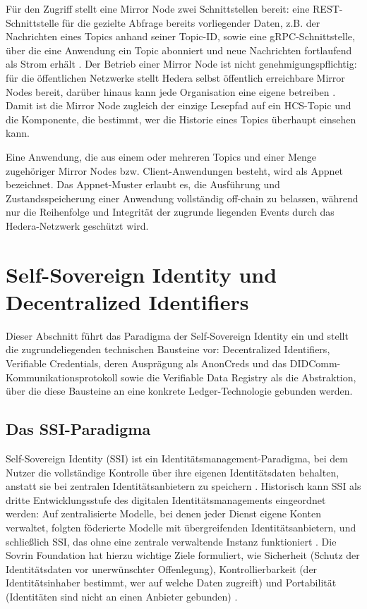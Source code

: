 Für den Zugriff stellt eine Mirror Node zwei Schnittstellen bereit: eine REST-Schnittstelle für die gezielte Abfrage bereits vorliegender Daten, z.B. der Nachrichten eines Topics anhand seiner Topic-ID, sowie eine gRPC-Schnittstelle, über die eine Anwendung ein Topic abonniert und neue Nachrichten fortlaufend als Strom erhält \cite{hederamirrornodes}. Der Betrieb einer Mirror Node ist nicht genehmigungspflichtig: für die öffentlichen Netzwerke stellt Hedera selbst öffentlich erreichbare Mirror Nodes bereit, darüber hinaus kann jede Organisation eine eigene betreiben \cite{hederamirrornodes, hederamainnetnodes}. Damit ist die Mirror Node zugleich der einzige Lesepfad auf ein HCS-Topic und die Komponente, die bestimmt, wer die Historie eines Topics überhaupt einsehen kann.

Eine Anwendung, die aus einem oder mehreren Topics und einer Menge zugehöriger Mirror Nodes bzw. Client-Anwendungen besteht, wird als Appnet bezeichnet. Das Appnet-Muster erlaubt es, die Ausführung und Zustandsspeicherung einer Anwendung vollständig off-chain zu belassen, während nur die Reihenfolge und Integrität der zugrunde liegenden Events durch das Hedera-Netzwerk geschützt wird. \cite{bairdgross2019}


\section{Self-Sovereign Identity und Decentralized Identifiers}
\label{sec:grundlagen-ssi}
Dieser Abschnitt führt das Paradigma der Self-Sovereign Identity ein und stellt die zugrundeliegenden technischen Bausteine vor: Decentralized Identifiers, Verifiable Credentials, deren Ausprägung als AnonCreds und das DIDComm-Kommunikationsprotokoll sowie die Verifiable Data Registry als die Abstraktion, über die diese Bausteine an eine konkrete Ledger-Technologie gebunden werden.

\subsection{Das SSI-Paradigma}
Self-Sovereign Identity (SSI) ist ein Identitätsmanagement-Paradigma, bei dem Nutzer die vollständige Kontrolle über ihre eigenen Identitätsdaten behalten, anstatt sie bei zentralen Identitätsanbietern zu speichern \cite{mazzocca2025}. Historisch kann SSI als dritte Entwicklungsstufe des digitalen Identitätsmanagements eingeordnet werden: Auf zentralisierte Modelle, bei denen jeder Dienst eigene Konten verwaltet, folgten föderierte Modelle mit übergreifenden Identitätsanbietern, und schließlich SSI, das ohne eine zentrale verwaltende Instanz funktioniert \cite{mazzocca2025}. Die Sovrin Foundation hat hierzu wichtige Ziele formuliert, wie Sicherheit (Schutz der Identitätsdaten vor unerwünschter Offenlegung), Kontrollierbarkeit (der Identitätsinhaber bestimmt, wer auf welche Daten zugreift) und Portabilität (Identitäten sind nicht an einen Anbieter gebunden) \cite{sovrin2018}.

